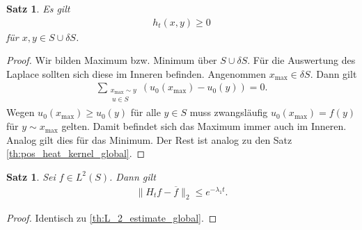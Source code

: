 \documentclass[headsepline,11pt]{scrbook}
\newtheorem{thm}[lem]{Satz}
\theoremstyle{definition}
\begin{document}
\begin{thm}
	Es gilt 
	\begin{align}
	h_t(x,y) \geq 0
	\end{align}
	f\"ur $ x,y \in S \cup \delta S $.
\end{thm}
\begin{proof}
	Wir bilden Maximum bzw. Minimum \"uber $ S \cup \delta S $. F\"ur die Auswertung des Laplace sollten sich diese im Inneren befinden.
	Angenommen $ x_\mathrm{max} \in \delta S $.
	Dann gilt 
	\begin{align*}
	\sum \limits_{
		\substack{x_\mathrm{max} \sim y \\ \ u \in S}
	}
	(u_0(x_\mathrm{max}) - u_0(y )) = 0.
	\end{align*}
	Wegen $ u_0(x_\mathrm{max}) \geq u_0(y) $ f\"ur alle $ y \in S $ muss zwangsl\"aufig $ u_0(x_\mathrm{max}) = f(y) $ f\"ur $ y \sim  x_\mathrm{max}$ gelten. 
	Damit befindet sich das Maximum immer auch im Inneren.
	Analog gilt dies f\"ur das Minimum.
	Der Rest ist analog zu den Satz \ref{th:pos_heat_kernel_global}.
\end{proof}


\begin{thm}
	Sei $ f \in L^2(S) $.
	Dann gilt
	\begin{align*}
	\| H_t f - \overline{f}  \|_2 \leq e^{-\lambda_1 t}. 
	\end{align*}
\end{thm}

\begin{proof}
Identisch zu \ref{th:L_2_estimate_global}.	
\end{proof}
\end{document}
